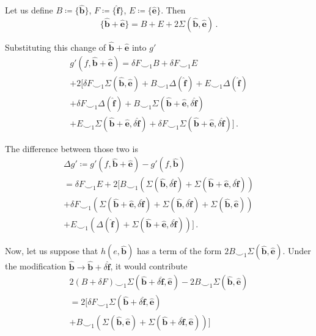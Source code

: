 \documentclass[aps,twocolumn,prx,floatfix,preprintnumbers, nofootinbib,10pt]{revtex4-2}
\numberwithin{equation}{section}
\theoremstyle{definition}
\theoremstyle{remark}
\theoremstyle{claim}
\newcommand{\be}{\begin{equation}}
\newcommand{\ee}{\end{equation}}
\newcommand{\paren}[1]{\left( #1 \right)}
\begin{document}
Let us define $B \coloneqq \{\bm{\hat{b}}\}$, $F \coloneqq \{\bm{\hat{f}}\}$, $E \coloneqq \{\bm{\hat{e}}\}$. Then
\be
\{\bm{\hat{b}} + \bm{\hat{e}}\} = B + E + 2 \Sigma(\bm{\hat{b}}, \bm{\hat{e}}) \,.
\ee

Substituting this change of $\bm{\hat{b}} + \bm{\hat{e}}$ into $g'$
\begin{multline}
 g'(f, \bm{\hat{b}} + \bm{\hat{e}}) = \delta F \smile_1 B + \delta F \smile_1 E \\
 + 2 \Big[ \delta F \smile_1 \Sigma(\bm{\hat{b}}, \bm{\hat{e}})
 + B \smile_1 \Delta(\bm{\hat{f}}) + E \smile_1 \Delta(\bm{\hat{f}}) \\
 + \delta F \smile_1 \Delta(\bm{\hat{f}}) + B \smile_1 \Sigma(\bm{\hat{b}} + \bm{\hat{e}}, \delta \bm{\hat{f}}) \\
 + E \smile_1 \Sigma(\bm{\hat{b}} + \bm{\hat{e}}, \delta \bm{\hat{f}}) + \delta F \smile_1 \Sigma(\bm{\hat{b}} + \bm{\hat{e}}, \delta \bm{\hat{f}}) \Big] \,.
\end{multline}

The difference between those two is
\begin{multline}
 \Delta g' \coloneqq g'(f, \bm{\hat{b}} + \bm{\hat{e}}) - g'(f, \bm{\hat{b}}) \\
 = \delta F \smile_1 E + 2 \Big[ B \smile_1 \paren{\Sigma(\bm{\hat{b}}, \delta \bm{\hat{f}}) + \Sigma(\bm{\hat{b}} + \bm{\hat{e}}, \delta \bm{\hat{f}})} \\
 + \delta F \smile_1 \paren{\Sigma(\bm{\hat{b}} + \bm{\hat{e}}, \delta \bm{\hat{f}}) + \Sigma(\bm{\hat{b}}, \delta \bm{\hat{f}}) + \Sigma(\bm{\hat{b}}, \bm{\hat{e}})} \\
 + E \smile_1 \paren{\Delta(\bm{\hat{f}}) + \Sigma(\bm{\hat{b}} + \bm{\hat{e}}, \delta \bm{\hat{f}})} \Big] \,.
\end{multline}

Now, let us suppose that $h(e, \bm{\hat{b}})$ has a term of the form $2 B \smile_1 \Sigma(\bm{\hat{b}}, \bm{\hat{e}})$. Under the modification $\bm{\hat{b}} \to \bm{\hat{b}} + \delta \bm{\hat{f}}$, it would contribute
\begin{multline}
 2(B + \delta F) \smile_1 \Sigma(\bm{\hat{b}} + \delta \bm{\hat{f}}, \bm{\hat{e}}) - 2 B \smile_1 \Sigma(\bm{\hat{b}}, \bm{\hat{e}}) \\
 = 2 \bigg[ \delta F \smile_1 \Sigma(\bm{\hat{b}} + \delta \bm{\hat{f}}, \bm{\hat{e}}) \\
 + B \smile_1 \paren{\Sigma(\bm{\hat{b}}, \bm{\hat{e}}) + \Sigma(\bm{\hat{b}} + \delta \bm{\hat{f}}, \bm{\hat{e}})} \bigg]
\end{multline}
\end{document}
